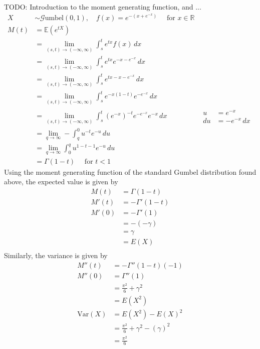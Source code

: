 \documentclass[titlepage,12 pt]{article}
\newcommand{\R}{{\mathbb R}}
\newcommand{\E}{\mathbb{E}}
\begin{document}
TODO: Introduction to the moment generating function, and ...
\begin{align*}
    X & \sim \mathcal{G}\text{umbel}(0,1), \quad f(x) = e^{-(x + e^{-x})} \quad \text{ for } x \in \R \\[6mm]
    M(t) &= \E(e^{tX}) \\
         &= \lim_{(s, t)\to (-\infty, \infty)} \int_{s}^{t} e^{tx}f(x) \, dx \\
         &= \lim_{(s, t)\to (-\infty, \infty)} \int_{s}^{t} e^{tx}e^{-x - e^{-x}} \, dx \\
         &= \lim_{(s, t)\to (-\infty, \infty)} \int_{s}^{t} e^{tx - x - e^{-x}} \, dx \\
         &= \lim_{(s, t)\to (-\infty, \infty)} \int_{s}^{t} e^{-x(1-t)}e^{-e^{-x}} \, dx \\
         &= \lim_{(s, t)\to (-\infty, \infty)} \int_{s}^{t} \left(e^{-x}\right)^{-t}e^{-e^{-x}}e^{-x} \, dx
             & \boxed{\begin{aligned}u &= e^{-x} \\
             du &= -e^{-x} \, dx \end{aligned}} \\
        &= \lim_{q\to\infty} -\int_{q}^{0} u^{-t}e^{-u} \, du \\
        &= \lim_{q\to\infty}\int_{0}^{q} u^{1-t-1}e^{-u} \, du \\
        &= \Gamma(1-t) \quad \text{ for } t < 1
\end{align*}
Using the moment generating function of the standard Gumbel distribution found above, the expected value is given by
\begin{align*}
M(t)&=\Gamma(1-t) \\[3mm]
M'(t)&=-\Gamma'(1-t) \\[3mm]
M'(0)&=-\Gamma'(1) \\
    &=-(-\gamma) \\
    &= \gamma \\
    &= E(X) \\
\end{align*}
Similarly, the variance is given by
\begin{align*}
M''(t)&=-\Gamma''(1-t)(-1) \\[3mm]
M''(0)&=\Gamma''(1) \\
    &=\frac{\pi^2}{6}+\gamma^2 \\
    &= E(X^2) \\[3mm]
    \text{Var}(X)&= E(X^2)-E(X)^2 \\
    &=\frac{\pi^2}{6}+\gamma^2-(\gamma)^2 \\
    &=\frac{\pi^2}{6} \\
\end{align*}
\end{document}
